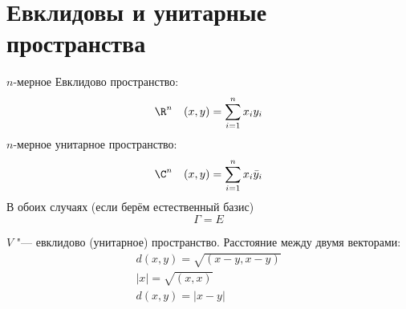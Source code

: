 \section{Евклидовы и унитарные пространства}

\begin{Def}
	$n$-мерное Евклидово пространство:
	\[ \R^n \quad (x, y) = \sum_{i=1}^n x_iy_i \]
	$n$-мерное унитарное пространство:
	\[ \C^n \quad (x, y) = \sum_{i=1}^n x_i \bar y_i \]
	В обоих случаях (если берём естественный базис)
	\[ \Gamma = E \]
\end{Def}

\begin{Def}
	$V$ "--- евклидово (унитарное) пространство.
	Расстояние между двумя векторами:
	\begin{gather*}
		d(x, y) = \sqrt{(x - y, x - y)} \\
		|x| = \sqrt{(x, x)} \\
		d(x, y) = |x - y|
	\end{gather*}
\end{Def}

